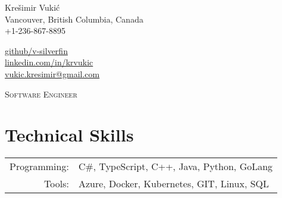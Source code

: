 \documentclass[a4paper,10pt]{article} %
\begin{document}
\pagestyle{empty} %

\begin{minipage}{.5\textwidth}
\LARGE{Krešimir Vukić}\\
\normalsize{Vancouver, British Columbia, Canada} \\
+1-236-867-8895
\end{minipage}%
\begin{minipage}{.5\textwidth}
\raggedleft
\href{https://github.com/v-silverfin}{github/v-silverfin}\\
\href{https://www.linkedin.com/in/krvukic/}{linkedin.com/in/krvukic} \\
\href{mailto:vukic.kresimir@gmail.com}{vukic.kresimir@gmail.com} \\
\end{minipage}
\vspace{3mm}

\begin{center}
\textsc{\large{Software Engineer}}
\end{center}
\vspace{2mm}

\section{Technical Skills}

\begin{tabular}{rl}
    Programming:   &  C\#, TypeScript, C++, Java, Python, GoLang \\
    Tools: &  Azure, Docker, Kubernetes, GIT, Linux, SQL \\
\end{tabular}
\vspace{3mm}

\end{document}

